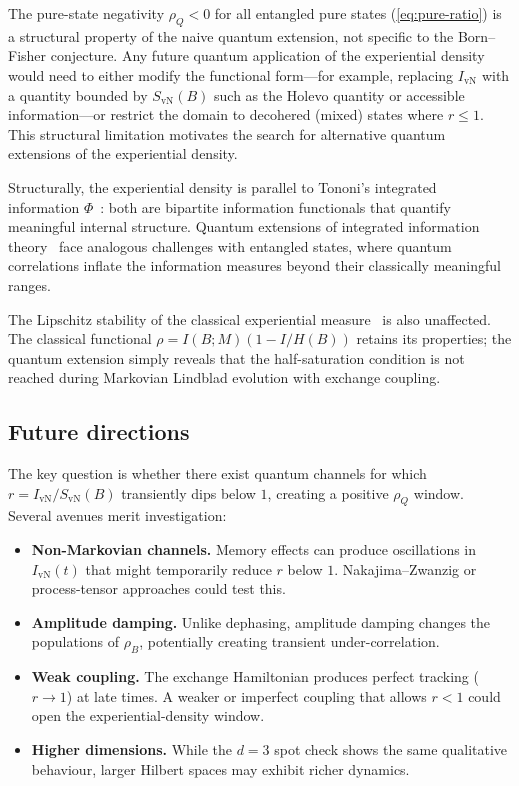 \documentclass[12pt,a4paper]{article}
\newcommand{\SvN}{S_{\mathrm{vN}}}
\newcommand{\IvN}{I_{\mathrm{vN}}}
\newcommand{\rhoQ}{\rho_Q}
\begin{document}
The pure-state negativity $\rhoQ < 0$ for all entangled pure states
(\cref{eq:pure-ratio}) is a structural property of the naive quantum
extension, not specific to the Born--Fisher conjecture.  Any future
quantum application of the experiential density would need to either
modify the functional form---for example, replacing $\IvN$ with a
quantity bounded by $\SvN(B)$ such as the Holevo quantity or
accessible information---or restrict the domain to decohered
(mixed) states where $r \le 1$.  This structural limitation
motivates the search for alternative quantum extensions of the
experiential density.

Structurally, the experiential density is parallel to Tononi's
integrated information $\Phi$~\cite{Tononi2004}: both are bipartite
information functionals that quantify meaningful internal structure.
Quantum extensions of integrated information
theory~\cite{Zanardi2018} face analogous challenges with entangled
states, where quantum correlations inflate the information measures
beyond their classically meaningful ranges.

The Lipschitz stability of the classical experiential
measure~\cite{Ehrlich2026b} is also unaffected.  The classical
functional $\rho = I(B;M)(1 - I/H(B))$ retains its properties;
the quantum extension simply reveals that the half-saturation
condition is not reached during Markovian Lindblad evolution with
exchange coupling.

\subsection{Future directions}

The key question is whether there exist quantum channels for which
$r = \IvN/\SvN(B)$ transiently dips below $1$, creating a positive
$\rhoQ$ window.  Several avenues merit investigation:

\begin{itemize}
  \item \textbf{Non-Markovian channels.}  Memory effects can
    produce oscillations in $\IvN(t)$ that might temporarily reduce
    $r$ below $1$.  Nakajima--Zwanzig or process-tensor approaches
    could test this.
  \item \textbf{Amplitude damping.}  Unlike dephasing, amplitude
    damping changes the populations of $\rho_B$, potentially
    creating transient under-correlation.
  \item \textbf{Weak coupling.}  The exchange Hamiltonian produces
    perfect tracking ($r \to 1$) at late times.  A weaker or
    imperfect coupling that allows $r < 1$ could open the
    experiential-density window.
  \item \textbf{Higher dimensions.}  While the $d = 3$ spot check
    shows the same qualitative behaviour, larger Hilbert spaces may
    exhibit richer dynamics.
\end{itemize}
\end{document}
